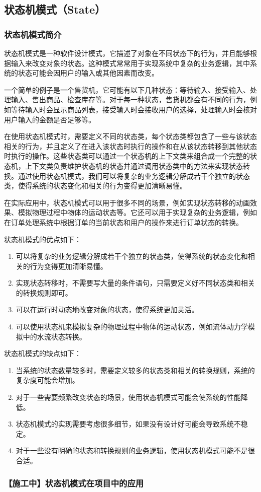 \subsection{状态机模式（State）}

\subsubsection{状态机模式简介}


状态机模式是一种软件设计模式，它描述了对象在不同状态下的行为，并且能够根据输入来改变对象的状态。这种模式常常用于实现系统中复杂的业务逻辑，其中系统的状态可能会因用户的输入或其他因素而改变。

一个简单的例子是一个售货机，它可能有以下几种状态：等待输入、接受输入、处理输入、售出商品、检查库存等。对于每一种状态，售货机都会有不同的行为，例如等待输入时会显示商品列表，接受输入时会接收用户的选择，处理输入时会核对用户输入的金额是否足够等。

在使用状态机模式时，需要定义不同的状态类，每个状态类都包含了一些与该状态相关的行为，并且定义了在进入该状态时执行的操作和在从该状态转移到其他状态时执行的操作。这些状态类可以通过一个状态机的上下文类来组合成一个完整的状态机，上下文类负责维护状态机的状态并通过调用状态类中的方法来实现状态转换。通过使用状态机模式，我们可以将复杂的业务逻辑分解成若干个独立的状态类，使得系统的状态变化和相关的行为变得更加清晰易懂。

在实际应用中，状态机模式可以用于很多不同的场景，例如实现状态转移的动画效果、模拟物理过程中物体的运动状态等。它还可以用于实现复杂的业务逻辑，例如在订单处理系统中根据订单的当前状态和用户的操作来进行订单状态的转换。

状态机模式的优点如下：
\begin{enumerate}
\item 可以将复杂的业务逻辑分解成若干个独立的状态类，使得系统的状态变化和相关的行为变得更加清晰易懂。
\item 实现状态转移时，不需要写大量的条件语句，只需要定义好不同状态类和相关的转换规则即可。
\item 可以在运行时动态地改变对象的状态，使得系统更加灵活。
\item 可以使用状态机来模拟复杂的物理过程中物体的运动状态，例如流体动力学模拟中的水流状态转换。
\end{enumerate}

状态机模式的缺点如下：
\begin{enumerate}
\item 当系统的状态数量较多时，需要定义较多的状态类和相关的转换规则，系统的复杂度可能会增加。
\item 对于一些需要频繁改变状态的场景，使用状态机模式可能会使系统的性能降低。
\item 状态机模式的实现需要考虑很多细节，如果没有设计好可能会导致系统不稳定。
\item 对于一些没有明确的状态和转换规则的业务逻辑，使用状态机模式可能不是很合适。
\end{enumerate}



\subsubsection{【施工中】状态机模式在项目中的应用}